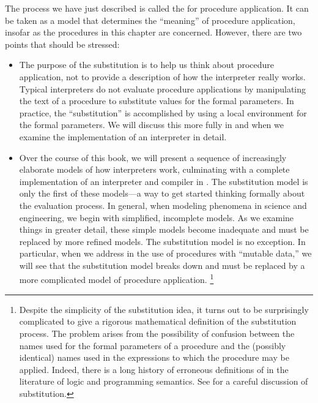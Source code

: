 The process we have just described is called the  for procedure application.
It can be taken as a model that determines the “meaning” of procedure application, insofar as the procedures in this chapter are concerned.
However, there are two points that should be stressed:
\begin{itemize}

	\item
		The purpose of the substitution is to help us think about procedure application, not to provide a description of how the interpreter really works.
		Typical interpreters do not evaluate procedure applications by manipulating the
		text of a procedure to substitute values for the formal parameters.
		In practice, the “substitution” is accomplished by using a local environment for the formal parameters.
		We will discuss this more fully in  and  when we examine the implementation of an interpreter in detail.

	\item
		Over the course of this book, we will present a sequence of increasingly elaborate models of how interpreters work, culminating with a complete implementation of an interpreter and compiler in .
		The substitution model is only the first of these models---a way to get started thinking formally about the evaluation process.
		In general, when modeling phenomena in science and engineering, we begin with simplified, incomplete models.
		As we examine things in greater detail, these simple models become inadequate and must be replaced by more refined models.
		The substitution model is no exception.
		In particular, when we address in  the use of procedures with “mutable data,” we will see that the substitution model breaks down and must be replaced by a more complicated model of procedure application.%
		\footnote{
			Despite the simplicity of the substitution idea, it turns out to be surprisingly complicated to give a rigorous mathematical definition of the substitution process.
			The problem arises from the possibility of confusion between the names used for the formal parameters of a procedure and the (possibly identical) names used in the expressions to which the procedure may be applied.
			Indeed, there is a long history of erroneous definitions of  in the literature of logic and programming semantics.
			See  for a careful discussion of substitution.
		}

\end{itemize}



